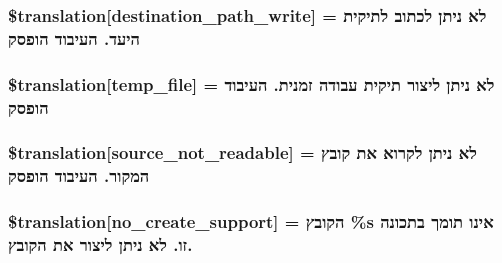 \subsubsection[{\$translation}]{\setlength{\rightskip}{0pt plus 5cm}\$translation\mbox{[}\textquotesingle{}destination\+\_\+path\+\_\+write\textquotesingle{}\mbox{]} = \textquotesingle{}לא ניתן לכתוב לתיקית היעד. העיבוד הופסק\textquotesingle{}}\label{class_8upload_8he___i_l_8php_a40e4e1962226b89fd76da5819a9602b0}
\hypertarget{class_8upload_8he___i_l_8php_a2baece8da11e20d45175db91851ec3e3}{}
\subsubsection[{\$translation}]{\setlength{\rightskip}{0pt plus 5cm}\$translation\mbox{[}\textquotesingle{}temp\+\_\+file\textquotesingle{}\mbox{]} = \textquotesingle{}לא ניתן ליצור תיקית עבודה זמנית. העיבוד הופסק\textquotesingle{}}\label{class_8upload_8he___i_l_8php_a2baece8da11e20d45175db91851ec3e3}
\hypertarget{class_8upload_8he___i_l_8php_a922967ca2df0efdd455261142d8e5715}{}
\subsubsection[{\$translation}]{\setlength{\rightskip}{0pt plus 5cm}\$translation\mbox{[}\textquotesingle{}source\+\_\+not\+\_\+readable\textquotesingle{}\mbox{]} = \textquotesingle{}לא ניתן לקרוא את קובץ המקור. העיבוד הופסק\textquotesingle{}}\label{class_8upload_8he___i_l_8php_a922967ca2df0efdd455261142d8e5715}
\hypertarget{class_8upload_8he___i_l_8php_a346dfd1ade29f583dd20d345c436859f}{}
\subsubsection[{\$translation}]{\setlength{\rightskip}{0pt plus 5cm}\$translation\mbox{[}\textquotesingle{}no\+\_\+create\+\_\+support\textquotesingle{}\mbox{]} = \textquotesingle{}הקובץ \%s אינו תומך בתכונה זו. לא ניתן ליצור את הקובץ.\textquotesingle{}}\label{class_8upload_8he___i_l_8php_a346dfd1ade29f583dd20d345c436859f}
\hypertarget{class_8upload_8he___i_l_8php_a53013ce9255c4e1849098ddd9fdb2b3f}{}
